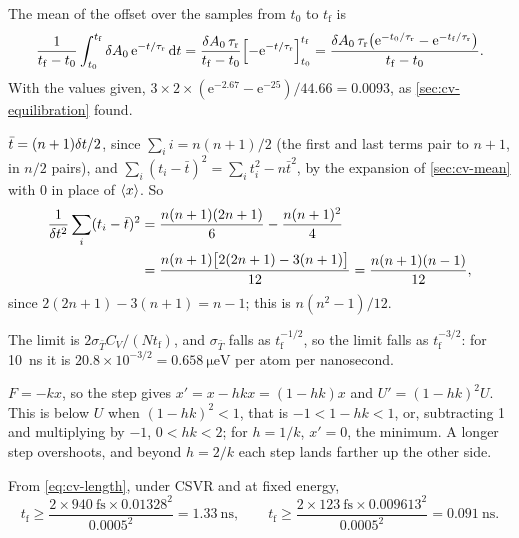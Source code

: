 The mean of the offset over the samples from
$t_0$ to $t_{\mathrm f}$ is
\begin{equation*}
   \frac{1}{t_{\mathrm f} - t_0}\int_{t_0}^{t_{\mathrm f}}\delta A_0\,\mathrm{e}^{-t/\tau_{\mathrm r}}\,\mathrm{d} t
   = \frac{\delta A_0\,\tau_{\mathrm r}}{t_{\mathrm f} - t_0}\Bigl[-\mathrm{e}^{-t/\tau_{\mathrm
   r}}\Bigr]_{t_0}^{t_{\mathrm f}}
   = \frac{\delta A_0\,\tau_{\mathrm r}\bigl(\mathrm{e}^{-t_0/\tau_{\mathrm r}} -
   \mathrm{e}^{-t_{\mathrm f}/\tau_{\mathrm r}}\bigr)}{t_{\mathrm f} - t_0} .
\end{equation*}
With the values given, $3\times2\times(\mathrm{e}^{-2.67} -
\mathrm{e}^{-25})/44.66 = 0.0093$, as \cref{sec:cv-equilibration} found.

$\bar t = (n + 1)\delta t/2$, since $\sum_ii = n(n + 1)/2$
(the first and last terms pair to $n + 1$, in $n/2$ pairs), and
$\sum_i(t_i - \bar t)^2 = \sum_it_i^2 - n\bar t^2$, by the expansion of
\cref{sec:cv-mean} with $0$ in place of $\langle x \rangle$. So
\begin{align*}
   \frac{1}{\delta t^2}\sum_i(t_i - \bar t)^2
   &= \frac{n(n + 1)(2n + 1)}{6} - \frac{n(n + 1)^2}{4}\\
   &= \frac{n(n + 1)\bigl[2(2n + 1) - 3(n + 1)\bigr]}{12}
   = \frac{n(n + 1)(n - 1)}{12} ,
\end{align*}
since $2(2n + 1) - 3(n + 1) = n - 1$; this is $n(n^2 - 1)/12$.

The limit is $2\sigma_{\bar T}C_V/(Nt_{\mathrm f})$,
and $\sigma_{\bar T}$ falls as $t_{\mathrm f}^{-1/2}$, so the limit falls as
$t_{\mathrm f}^{-3/2}$:
for \SI{10}{\nano\second} it is $20.8\times10^{-3/2} =
\SI{0.658}{\micro\electronvolt}$ per atom per nanosecond.

$F = -kx$, so the step gives $x' = x - hkx = (1
- hk)x$ and $U' = (1 - hk)^2U$. This is below $U$ when $(1 - hk)^2 < 1$,
that is $-1 < 1 - hk < 1$, or, subtracting 1 and multiplying by $-1$, $0 <
hk < 2$; for $h = 1/k$, $x' = 0$, the minimum. A longer
step overshoots, and beyond $h = 2/k$ each step lands farther up the other
side.

From \cref{eq:cv-length}, under CSVR and at
fixed energy,
\begin{equation*}
   t_{\mathrm f} \ge \frac{2\times\SI{940}{\femto\second}\times0.01328^2}{0.0005^2}
   = \SI{1.33}{\nano\second} , \qquad
   t_{\mathrm f} \ge \frac{2\times\SI{123}{\femto\second}\times0.009613^2}{0.0005^2}
   = \SI{0.091}{\nano\second} .
\end{equation*}


